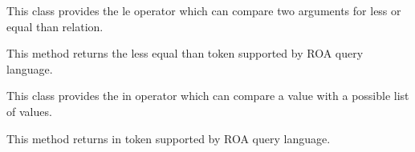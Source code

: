 \documentclass[letterpaper,10pt,english]{sphinxmanual}
\begin{document}
\begin{fulllineitems}
\label{features/roa/technical_summary:fantastico.roa.query_parser_operations.QueryParserOperationBinaryLe}
This class provides the le operator which can compare two arguments for less or equal than relation.

\begin{fulllineitems}
\label{features/roa/technical_summary:fantastico.roa.query_parser_operations.QueryParserOperationBinaryLe.get_token}
This method returns the less equal than token supported by ROA query language.

\end{fulllineitems}


\end{fulllineitems}


\begin{fulllineitems}
\label{features/roa/technical_summary:fantastico.roa.query_parser_operations.QueryParserOperationBinaryIn}
This class provides the in operator which can compare a value with a possible list of values.

\begin{fulllineitems}
\label{features/roa/technical_summary:fantastico.roa.query_parser_operations.QueryParserOperationBinaryIn.get_token}
This method returns in token supported by ROA query language.

\end{fulllineitems}


\end{fulllineitems}

\end{document}
